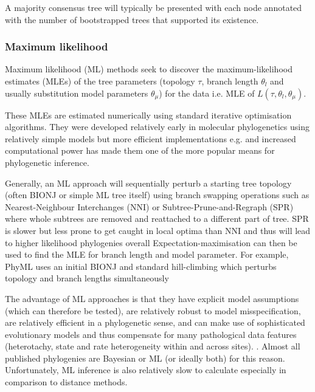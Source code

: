 A majority consensus tree will typically be presented with each node
annotated with the number of bootstrapped trees that supported its existence.

\subsubsection{Maximum likelihood}

Maximum likelihood (ML) methods seek to discover the maximum-likelihood estimates (MLEs) of the tree parameters 
(topology \(\tau\), branch length \(\theta_l\) and usually substitution model parameters \(\theta_\mu\))
for the data i.e. MLE of \(L(\tau, \theta_l, \theta_\mu)\). 

These MLEs are estimated numerically using standard iterative optimisation algorithms.
They were developed relatively early in molecular phylogenetics using relatively
simple models \citep{neyman1971molecular} but more efficient implementations e.g. \citep{Felsenstein1981}
and increased computational power has made them one of the more popular means
for phylogenetic inference.

Generally, an ML approach will sequentially perturb a starting tree topology (often BIONJ or simple ML tree itself) 
using branch swapping operations such as Nearest-Neighbour Interchanges (NNI)
or Subtree-Prune-and-Regraph (SPR) where whole subtrees are removed and reattached to a different part of tree. 
SPR is slower but less prone to get caught in local optima than NNI and thus will
lead to higher likelihood phylogenies overall \citep{Criscuolo2011}
Expectation-maximisation can then be used to find the MLE for branch length and model parameter.
For example, PhyML uses an initial BIONJ and standard hill-climbing which perturbs topology and branch lengths simultaneously 


The advantage of ML approaches is that they have explicit model assumptions (which can therefore be tested), are relatively robust to model
misspecification, are relatively efficient in a phylogenetic sense, and can make use of sophisticated evolutionary models and thus compensate
for many pathological data features (heterotachy, state and rate heterogeneity within and across sites).
\citep{Yang2012}. Almost all published phylogenies are Bayesian or ML (or ideally both) for this reason.
Unfortunately, ML inference is also relatively slow to calculate especially in comparison to distance methods.

